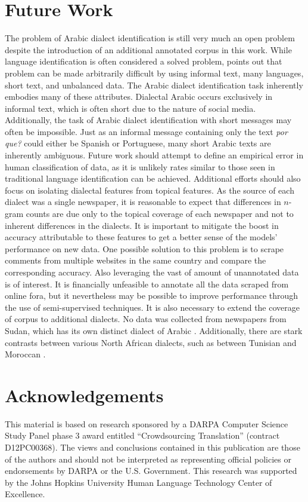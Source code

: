 \documentclass[10pt, a4paper]{article}
\begin{document}
\section{Future Work} The problem of Arabic dialect identification is
still very much an open problem despite the introduction of an
additional annotated corpus in this work. While language identification is often
considered a solved problem,  points out
that problem can be made arbitrarily difficult by using informal text,
many languages, short text, and unbalanced data. The Arabic dialect
identification
task inherently embodies many of these attributes. Dialectal Arabic
occurs exclusively in informal text, which is often short due to the
nature of social media. Additionally, the task of Arabic dialect
identification with short messages may often be impossible. Just as an
informal message containing only the text \textit{por que?} could
either be Spanish or Portuguese, many short Arabic texts are
inherently ambiguous. Future work should attempt to define an
empirical error in human classification of data, as it is unlikely
rates similar to those seen in traditional language identification can be achieved. 
Additional efforts should also focus on isolating dialectal features from topical
features. As the source of each dialect was a single newspaper, it is
reasonable to expect that differences in $n$-gram counts are due only to
the topical coverage of each newspaper and not to inherent
differences in the dialects. It is important to mitigate the boost in accuracy attributable
to these features to get a better sense of the models' performance on
new data. One possible solution to this problem is to scrape comments
from multiple websites in the same country and compare the
corresponding accuracy. Also leveraging the vast of amount of
unannotated data is of interest. It is financially unfeasible to
annotate all the data scraped from online fora, but it nevertheless
may be possible to improve performance through the use of
semi-supervised techniques. It is also necessary to extend the
coverage of corpus to additional dialects. No data was collected from
newspapers from Sudan, which has its own distinct dialect of Arabic
\cite{comrie2013major}. Additionally, there are stark contrasts
between various North African dialects, such as between Tunisian and
Moroccan \cite{comrie2013major}.

\section*{Acknowledgements}
This material is based on research sponsored by a DARPA Computer Science Study Panel phase 3 award entitled ``Crowdsourcing Translation'' (contract D12PC00368). The views and conclusions contained in this publication are those of the authors and should not be interpreted as representing official policies or endorsements by DARPA or the U.S. Government. This research was supported by the Johns Hopkins University Human Language Technology Center of Excellence.





\end{document}
